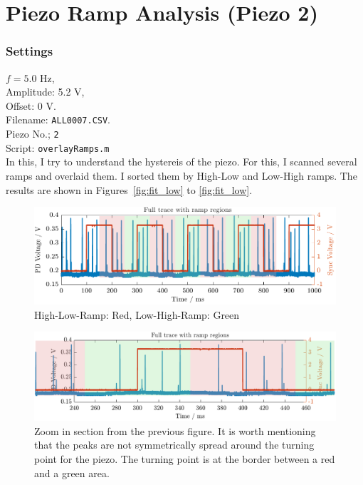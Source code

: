 \documentclass[a4paper,11pt]{article}
\begin{document}
\newpage
\section{Piezo Ramp Analysis (Piezo 2)}
\subsubsection*{Settings}

$f = 5.0$ Hz,  \\
Amplitude: 5.2 V,  \\
Offset: 0 V.  \\
Filename: \texttt{ALL0007.CSV}.   \\
Piezo No.; \texttt{2}  \\
Script: \texttt{overlayRamps.m} \\


In this, I try to understand the hystereis of the piezo. For this, I scanned several ramps and overlaid them.
I sorted them by High-Low and Low-High ramps. The results are shown in Figures~\ref{fig:fit_low} to \ref{fig:fit_low}.


\begin{figure}[H]
    \centering
    \includegraphics[width=\textwidth]{ManyRamp/ManyRamps.pdf}
    \caption{High-Low-Ramp: Red, Low-High-Ramp: Green}
\end{figure}

\begin{figure}[H]
    \centering
    \includegraphics[width=\textwidth]{ManyRamp/Zoomed_Ramp.pdf}
    \caption{Zoom in section from the previous figure. It is worth mentioning that the peaks are not symmetrically spread around the turning point for the piezo. The turning point is at the border between a red and a green area.}
\end{figure}
\end{document}
